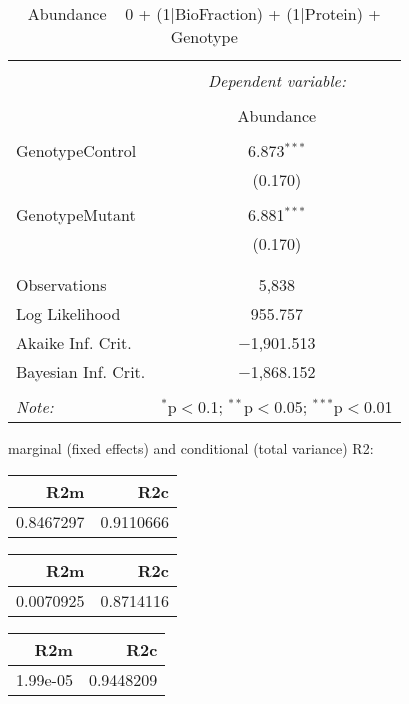 \documentclass[11pt]{report}
\begin{document}
\begin{table}[!htbp] \centering 
  \caption{Abundance ~ 0 + (1|BioFraction) + (1|Protein) + Genotype} 
  \label{} 
\begin{tabular}{@{\extracolsep{5pt}}lc} 
\\[-1.8ex]\hline 
\hline \\[-1.8ex] 
 & \multicolumn{1}{c}{\textit{Dependent variable:}} \\ 
\cline{2-2} 
\\[-1.8ex] & Abundance \\ 
\hline \\[-1.8ex] 
 GenotypeControl & 6.873$^{***}$ \\ 
  & (0.170) \\ 
  & \\ 
 GenotypeMutant & 6.881$^{***}$ \\ 
  & (0.170) \\ 
  & \\ 
\hline \\[-1.8ex] 
Observations & 5,838 \\ 
Log Likelihood & 955.757 \\ 
Akaike Inf. Crit. & $-$1,901.513 \\ 
Bayesian Inf. Crit. & $-$1,868.152 \\ 
\hline 
\hline \\[-1.8ex] 
\textit{Note:}  & \multicolumn{1}{r}{$^{*}$p$<$0.1; $^{**}$p$<$0.05; $^{***}$p$<$0.01} \\ 
\end{tabular} 
\end{table} 
marginal (fixed effects) and conditional (total variance) R2:

\begin{tabular}{r|r}
\hline
R2m & R2c\\
\hline
0.8467297 & 0.9110666\\
\hline
\end{tabular}

\begin{tabular}{r|r}
\hline
R2m & R2c\\
\hline
0.0070925 & 0.8714116\\
\hline
\end{tabular}

\begin{tabular}{r|r}
\hline
R2m & R2c\\
\hline
1.99e-05 & 0.9448209\\
\hline
\end{tabular}
\end{document}
